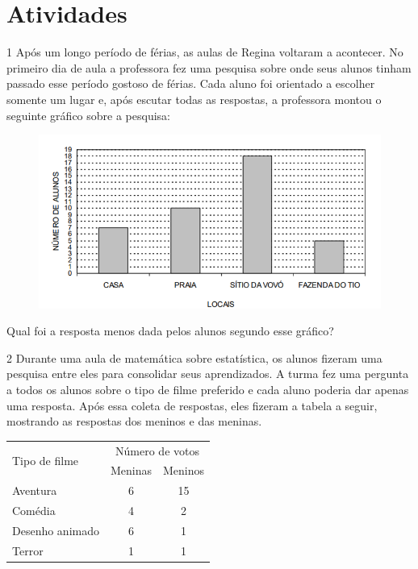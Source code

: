 \pagebreak
\section{Atividades}

\num{1} Após um longo período de férias, as aulas de Regina voltaram a
acontecer. No primeiro dia de aula a professora fez uma pesquisa sobre
onde seus alunos tinham passado esse período gostoso de férias. Cada
aluno foi orientado a escolher somente um lugar e, após escutar todas as
respostas, a professora montou o seguinte gráfico sobre a pesquisa:

\begin{figure}[htpb!]
\includegraphics[width=\textwidth]{./imgs/mat11.png}
\end{figure}

Qual foi a resposta menos dada pelos alunos segundo esse gráfico?


\num{2} Durante uma aula de matemática sobre estatística, os alunos fizeram
uma pesquisa entre eles para consolidar seus aprendizados. A turma fez
uma pergunta a todos os alunos sobre o tipo de filme preferido e cada
aluno poderia dar apenas uma resposta. Após essa coleta de respostas,
eles fizeram a tabela a seguir, mostrando as respostas dos meninos e das meninas.

\begin{center}
\begin{tabular}{l|cc}
\hline
\multirow{2}{*}{Tipo de filme} & \multicolumn{2}{c}{Número de votos} \\ \cline{2-3} 
 & \multicolumn{1}{c|}{Meninas} & Meninos \\ \hline
Aventura & \multicolumn{1}{c|}{6} & 15 \\ \hline
Comédia & \multicolumn{1}{c|}{4} & 2 \\ \hline
Desenho animado & \multicolumn{1}{c|}{6} & 1 \\ \hline
Terror & \multicolumn{1}{c|}{1} & 1 \\ \hline
\end{tabular}
\end{center}

